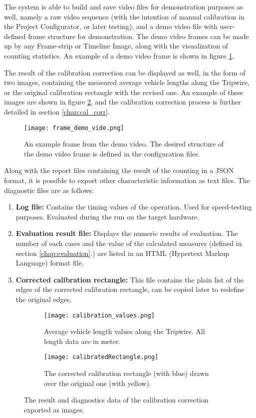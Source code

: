 The system is able to build and save video files for demonstration purposes as well, namely a raw video sequence (with the intention of manual calibration in the Project Configurator, or later testing), and a demo video file with user-defined frame structure for demonstration.
The demo video frames can be made up by any Frame-strip or Timeline Image, along with the visualization of counting statistics.
An example of a demo video frame is shown in figure \ref{fig:demo_video}.

The result of the calibration correction can be displayed as well, in the form of two images, containing the measured average vehicle lengths along the Tripwire, or the original calibration rectangle with the revised one. 
An example of these images are shown in figure \ref{fig:cal_corr_example}, and the calibration correction process is further detailed in section \ref{chap:cal_corr}.

\begin{figure}[!h]
	\centering
	\texttt{[image: frame\_demo\_vide.png]}
	\caption{An example frame from the demo video. The desired structure of the demo video frame is defined in the configuration files.  \label{fig:demo_video}}
\end{figure}

Along with the report files containing the result of the counting in a JSON format, it is possible to export other characteristic information as text files.
The diagnostic files are as follows:
\begin{enumerate}
	\item \textbf{Log file: } Contains the timing values of the operation. Used for speed-testing purposes. Evaluated during the run on the target hardware.
	\item \textbf{Evaluation result file: } Displays the numeric results of evaluation. The number of each cases and the value of the calculated measures (defined in section \ref{chap:evaluation}.) are listed in an HTML (Hypertext Markup Language) format file.
	\item \textbf{Corrected calibration rectangle: } This file contains the plain list of the edges of the corrected calibration rectangle, can be copied later to redefine the original edges.
\end{enumerate}

\begin{figure}[!h]
	\centering
	\begin{subfigure}[b]{0.4\textwidth}
		\texttt{[image: calibration\_values.png]}
		\caption{Average vehicle length values along the Tripwire. All length data are in meter.}
	\end{subfigure}
	\quad
	\begin{subfigure}[b]{0.4\textwidth}
		\texttt{[image: calibratedRectangle.png]}
		\caption{The corrected calibration rectangle (with blue) drawn over the original one (with yellow).}
	\end{subfigure}
	\caption{The result and diagnostics data of the calibration correction exported as images.\label{fig:cal_corr_example}}
\end{figure}

